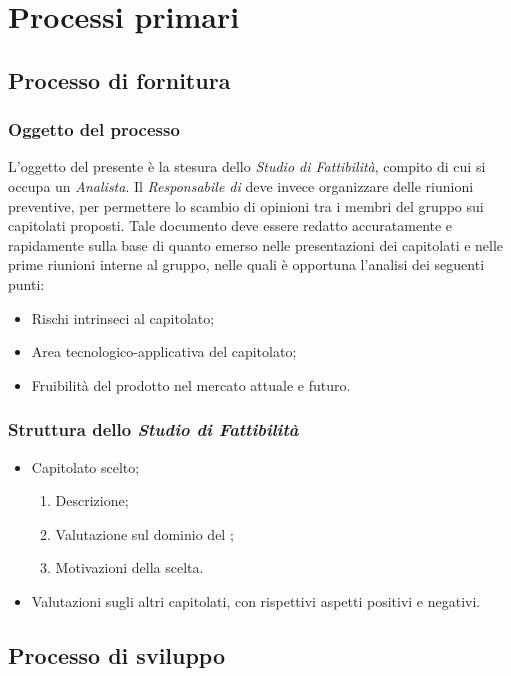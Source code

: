 \section{Processi primari}

	\subsection{Processo di fornitura}	
	\subsubsection{Oggetto del processo}
	L'oggetto del presente  è la stesura dello \textit{Studio di Fattibilità}, compito
	di cui si occupa un \textit{Analista}. Il \textit{Responsabile di } deve invece organizzare delle riunioni preventive, 
	per permettere lo scambio di opinioni tra i membri del gruppo sui capitolati proposti.
	Tale documento deve essere redatto accuratamente e rapidamente sulla base di quanto emerso nelle presentazioni dei capitolati e 
	nelle prime riunioni interne al gruppo, nelle quali è opportuna l'analisi dei seguenti punti:
	\begin{itemize}
		\item Rischi intrinseci al capitolato;
		\item Area tecnologico-applicativa del capitolato;
		\item Fruibilità del prodotto nel mercato attuale e futuro.
	\end{itemize}
	\subsubsection{Struttura dello \textit{Studio di Fattibilità}}
		\begin{itemize}
			\item Capitolato scelto;
				\begin{enumerate}
					\item Descrizione;
					\item Valutazione sul dominio del ;
					\item Motivazioni della scelta.
				\end{enumerate}	
			\item Valutazioni sugli altri capitolati, con rispettivi aspetti positivi e negativi.
		\end{itemize}

	\subsection{Processo di sviluppo}
